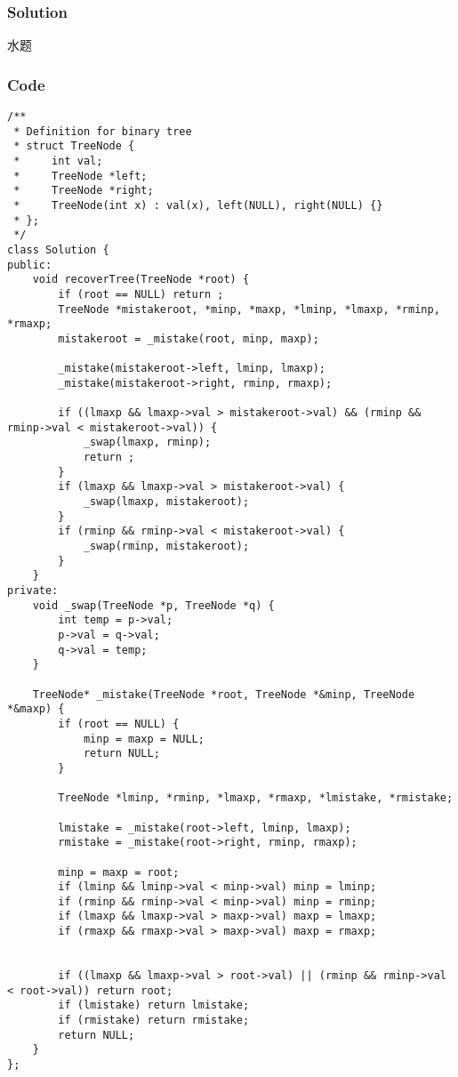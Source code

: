 \documentclass{article}
\begin{document}
\begin{CJK*}{UTF8}{gkai}

\subsubsection*{Solution}
水题

\subsubsection*{Code}
\begin{lstlisting}
/**
 * Definition for binary tree
 * struct TreeNode {
 *     int val;
 *     TreeNode *left;
 *     TreeNode *right;
 *     TreeNode(int x) : val(x), left(NULL), right(NULL) {}
 * };
 */
class Solution {
public:
    void recoverTree(TreeNode *root) {
        if (root == NULL) return ;
        TreeNode *mistakeroot, *minp, *maxp, *lminp, *lmaxp, *rminp, *rmaxp;
        mistakeroot = _mistake(root, minp, maxp);
        
        _mistake(mistakeroot->left, lminp, lmaxp);
        _mistake(mistakeroot->right, rminp, rmaxp);
        
        if ((lmaxp && lmaxp->val > mistakeroot->val) && (rminp && rminp->val < mistakeroot->val)) {
            _swap(lmaxp, rminp);
            return ;
        }
        if (lmaxp && lmaxp->val > mistakeroot->val) {
            _swap(lmaxp, mistakeroot);
        }
        if (rminp && rminp->val < mistakeroot->val) {
            _swap(rminp, mistakeroot);
        }
    }
private:
    void _swap(TreeNode *p, TreeNode *q) {
        int temp = p->val;
        p->val = q->val;
        q->val = temp;
    }
    
    TreeNode* _mistake(TreeNode *root, TreeNode *&minp, TreeNode *&maxp) {
        if (root == NULL) {
            minp = maxp = NULL;
            return NULL;
        }
    
        TreeNode *lminp, *rminp, *lmaxp, *rmaxp, *lmistake, *rmistake;
        
        lmistake = _mistake(root->left, lminp, lmaxp);
        rmistake = _mistake(root->right, rminp, rmaxp);
        
        minp = maxp = root;
        if (lminp && lminp->val < minp->val) minp = lminp;
        if (rminp && rminp->val < minp->val) minp = rminp;
        if (lmaxp && lmaxp->val > maxp->val) maxp = lmaxp;
        if (rmaxp && rmaxp->val > maxp->val) maxp = rmaxp;
        
        
        if ((lmaxp && lmaxp->val > root->val) || (rminp && rminp->val < root->val)) return root;
        if (lmistake) return lmistake;
        if (rmistake) return rmistake;
        return NULL;
    }
}; 
\end{lstlisting}



\end{CJK*}
\end{document}
